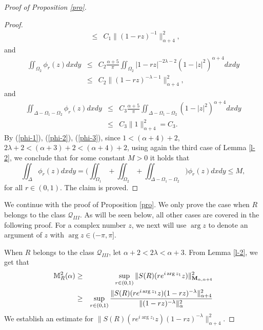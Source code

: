 \documentclass[10pt]{amsart}
\theoremstyle{definition}    %
\numberwithin{equation}{section}
\begin{document}
\begin{proof}[Proof of Proposition \ref{pro}]
\begin{proof}
\begin{eqnarray}
& \leq& C_1\|(1-rz)^{-1}\|_{\alpha+4}^2,\nonumber
 \end{eqnarray} 
 and 
\begin{eqnarray}\label{phi-2}
\iint_{\Omega_2}\phi_r(z)dxdy&\leq& C_2\frac{\alpha+5}{\pi}\iint_{\Omega_2}|1-rz|^{-2\lambda-2}(1-|z|^2)^{\alpha+4}dxdy   \\
& \leq& C_2\|(1-rz)^{-\lambda-1}\|_{\alpha+4}^2,\nonumber
 \end{eqnarray}and  
 \begin{eqnarray}\label{phi-3} 
 \iint_{\Delta-\Omega_1-\Omega_2}\phi_r(z)dxdy & \leq& C_3\frac{\alpha+5}{\pi}\iint_{\Delta-\Omega_1-\Omega_2}(1-|z|^2)^{\alpha+4}dxdy  \\
& \leq& C_3\|1\|_{\alpha+4}^2=C_3.\nonumber
 \end{eqnarray} 
By (\ref{phi-1}), (\ref{phi-2}), (\ref{phi-3}), since $1<(\alpha+4)+2$, $2\lambda+2<(\alpha+3)+2<(\alpha+4)+2$, using again the third case of Lemma \ref{l-2}, we conclude that for some constant $M>0$ it holds that 
\begin{equation*} 
\iint_{\Delta}\phi_r(z)dxdy=\Big(\iint_{\Omega_1}+\iint_{\Omega_2}+\iint_{\Delta-\Omega_1-\Omega_2}\Big)\phi_r(z)dxdy\leq M, \nonumber
 \end{equation*}
 for all $r\in (0,1)$. The claim is proved. 
  \end{proof}
  
We continue with the proof of Proposition \ref{pro}.  We only prove the case when $R$ belongs to the class $\mathcal{Q}_{III}$. %
As will be seen below, all other cases are covered in the following proof. For a complex number $z$, we next will use $\arg z$ to denote an argument of $z$ with $\arg z \in (-\pi, \pi]$. 

When $R$ belongs to the class $\mathcal{Q}_{III}$, let $\alpha+2<2\lambda<\alpha+3$. From Lemma \ref{l-2}, we get that
\begin{eqnarray}\label{jia-1}
\mathbb{M}_{R}^2(\alpha) &\geq& \sup\limits_{r\in (0,1)}\|S(R)(re^{i\arg z_1}z)\|_{{\bf M}_{\alpha, \alpha+4}}^2 \nonumber \\
&\geq &\sup\limits_{r\in (0,1)}\frac{\|S(R)(re^{i\arg z_1}z)(1-rz)^{-\lambda}\|_{\alpha+4}^2}{\|(1-rz)^{-\lambda}\|_{\alpha}^2}
\end{eqnarray}
We establish an estimate for $\|S(R)(re^{i\arg z_1}z)(1-rz)^{-\lambda}\|_{\alpha+4}^2$.


\end{proof}
\end{document}
